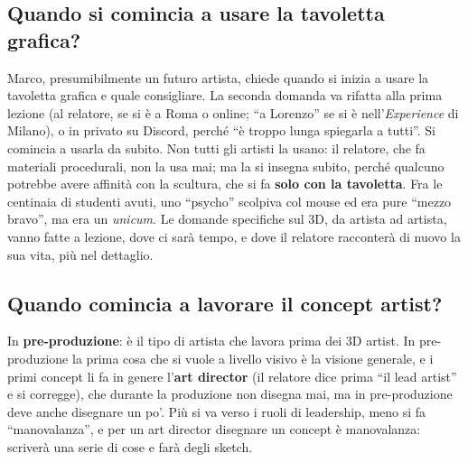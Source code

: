 \subsection{Quando si comincia a usare la tavoletta grafica?}

Marco, presumibilmente un futuro artista, chiede quando si inizia a usare la
tavoletta grafica e quale consigliare. La seconda domanda va rifatta alla prima
lezione (al relatore, se si è a Roma o online; ``a Lorenzo'' se si è
nell'\emph{Experience} di Milano), o in privato su Discord, perché ``è troppo
lunga spiegarla a tutti''. Si comincia a usarla da subito. Non tutti gli artisti
la usano: il relatore, che fa materiali procedurali, non la usa mai; ma la si
insegna subito, perché qualcuno potrebbe avere affinità con la scultura, che si
fa \textbf{solo con la tavoletta}. Fra le centinaia di studenti avuti, uno
``psycho'' scolpiva col mouse ed era pure ``mezzo bravo'', ma era un
\emph{unicum}. Le domande specifiche sul 3D, da artista ad artista, vanno fatte a
lezione, dove ci sarà tempo, e dove il relatore racconterà di nuovo la sua vita,
più nel dettaglio.

\subsection{Quando comincia a lavorare il concept artist?}

In \textbf{pre-produzione}: è il tipo di artista che lavora prima dei 3D artist.
In pre-produzione la prima cosa che si vuole a livello visivo è la visione
generale, e i primi concept li fa in genere l'\textbf{art director} (il
relatore dice prima ``il lead artist'' e si corregge), che durante la produzione
non disegna mai, ma in pre-produzione deve anche disegnare un po'. Più si va
verso i ruoli di leadership, meno si fa ``manovalanza'', e per un art director
disegnare un concept è manovalanza: scriverà una serie di cose e farà degli
sketch.

